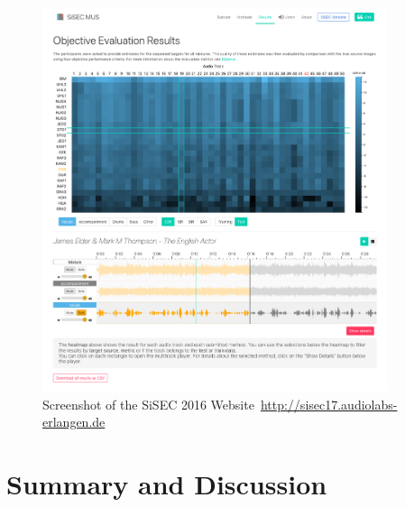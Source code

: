 \begin{figure}[!h]
\centering
\includegraphics[width=0.9\textwidth]{Chapters/06_Separation_Unknown/figures/sisec_website.png}
\caption{Screenshot of the \acs{SiSEC} 2016 Website~\url{http://sisec17.audiolabs-erlangen.de}}
\label{fig:sisec_website}

\end{figure}

\section{Summary and Discussion}

